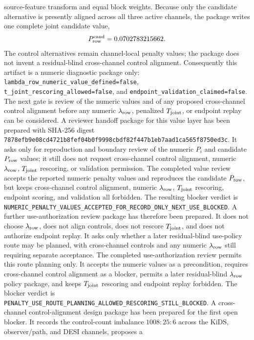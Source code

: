 source-feature transform and equal block weights.  Because only the candidate
alternative is presently aligned across all three active channels, the package
writes one complete joint candidate value,
\[
  P_{\rm row}^{\rm cand}=0.0702783215662 .
\]
The control alternatives remain channel-local penalty values; the package does
not invent a residual-blind cross-channel control alignment.  Consequently this
artifact is a numeric diagnostic package only:
\texttt{lambda\_row\_numeric\_value\_defined=false},
\texttt{t\_joint\_rescoring\_allowed=false}, and
\texttt{endpoint\_validation\_claimed=false}.  The next gate is review of the
numeric values and of any proposed cross-channel control alignment before any
numeric \(\lambda_{\rm row}\), penalized \(T_{\rm joint}\), or endpoint replay
can be considered.
A reviewer handoff package for this value layer has been prepared with
SHA-256 digest
\texttt{7878efb9e08cd4721b8fef04b0f9998cbdf82f447b1eb7aad1ca565f8750ed3c}.
It asks only for reproduction and boundary review of the numeric \(P_i\) and
candidate \(P_{\rm row}\) values; it still does not request cross-channel
control alignment, numeric \(\lambda_{\rm row}\), \(T_{\rm joint}\) rescoring,
or validation permission.
The completed value review accepts the reported numeric penalty values and
reproduces the candidate \(P_{\rm row}\), but keeps cross-channel control
alignment, numeric \(\lambda_{\rm row}\), \(T_{\rm joint}\) rescoring, endpoint
scoring, and validation all forbidden.  The resulting blocker verdict is
\texttt{NUMERIC\_PENALTY\_VALUES\_ACCEPTED\_FOR\_RECORD\_ONLY\_NEXT\_USE\_BLOCKED}.
A further use-authorization review package has therefore been prepared.  It
does not choose \(\lambda_{\rm row}\), does not align controls, does not rescore
\(T_{\rm joint}\), and does not authorize endpoint replay.  It asks only
whether a later residual-blind use-policy route may be planned, with
cross-channel controls and any numeric \(\lambda_{\rm row}\) still requiring
separate acceptance.
The completed use-authorization review permits this route planning only.  It
accepts the numeric values as a precondition, requires cross-channel control
alignment as a blocker, permits a later residual-blind \(\lambda_{\rm row}\)
policy package, and keeps \(T_{\rm joint}\) rescoring and endpoint replay
forbidden.  The blocker verdict is
\texttt{PENALTY\_USE\_ROUTE\_PLANNING\_ALLOWED\_RESCORING\_STILL\_BLOCKED}.
A cross-channel control-alignment design package has been prepared for the
first open blocker.  It records the control-count imbalance
\(1008:25:6\) across the KiDS, observer/path, and DESI channels, proposes a
